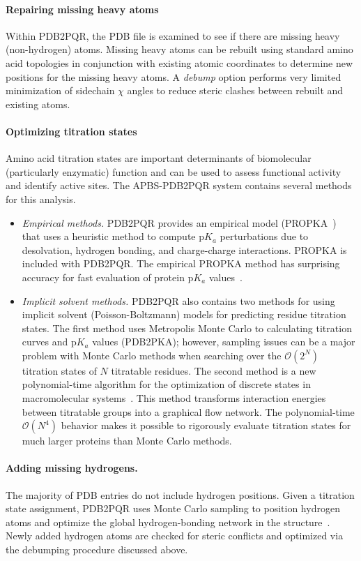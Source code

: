 \documentclass[12pt,titlepage]{article}
\begin{document}
\paragraph{Repairing missing heavy atoms}
Within PDB2PQR, the PDB file is examined to see if there are missing heavy (non-hydrogen) atoms.
Missing heavy atoms can be rebuilt using standard amino acid topologies in conjunction with existing atomic coordinates to determine new positions for the missing heavy atoms.
A \textit{debump} option performs very limited minimization of sidechain $\chi$ angles to reduce steric clashes between rebuilt and existing atoms.

\paragraph{Optimizing titration states}
Amino acid tit\-rat\-ion states are important determinants of bio\-molecular (particularly enzymatic) function and can be used to assess functional activity and identify active sites.
The APBS-PDB2PQR system contains several methods for this analysis.
\begin{itemize}
	\item \textit{Empirical methods.}
	PDB2PQR provides an empirical model (PROPKA~\cite{Sondergaard2011}) that uses a heuristic method to compute p$K_a$ perturbations due to desolvation, hydrogen bonding, and charge-charge interactions.
	PROPKA is included with PDB2PQR.
	The empirical PROPKA method has surprising accuracy for fast evaluation of protein p$K_a$ values~\cite{Li2005}.
	\item \textit{Implicit solvent methods.}
	PDB2PQR also contains two methods for using implicit solvent (Poisson-Boltzmann) models for predicting residue titration states.
	The first method uses Metropolis Monte Carlo to calculating titration curves and p$K_a$ values (PDB2PKA); however, sampling issues can be a major problem with Monte Carlo methods when searching over the $\mathcal{O}\left(2^N\right)$ titration states of $N$ titratable residues.
	The second method is a new polynomial-time algorithm for the optimization of discrete states in macromolecular systems~\cite{Purvine2016}.
	This method transforms interaction energies between titratable groups into a graphical flow network.
	The polynomial-time $\mathcal{O}\left(N^4\right)$ behavior makes it possible to rigorously evaluate titration states for much larger proteins than Monte Carlo methods.
\end{itemize}

\paragraph{Adding missing hydrogens.}
The majority of PDB entries do not include hydrogen positions.
Given a titration state assignment, PDB2PQR uses Monte Carlo sampling to position hydrogen atoms and optimize the global hydrogen-bonding network in the structure~\cite{Nielsen2001}.
Newly added hydrogen atoms are checked for steric conflicts and optimized via the debumping procedure discussed above.
\end{document}
